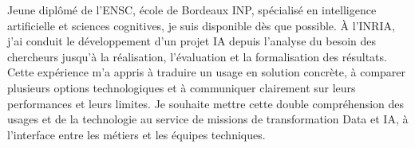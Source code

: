 
\begin{cvparagraph}
Jeune diplômé de l’ENSC, école de Bordeaux INP, spécialisé en intelligence artificielle et sciences cognitives, je suis disponible dès que possible. À l’INRIA, j’ai conduit le développement d’un projet IA depuis l’analyse du besoin des chercheurs jusqu’à la réalisation, l’évaluation et la formalisation des résultats. Cette expérience m’a appris à traduire un usage en solution concrète, à comparer plusieurs options technologiques et à communiquer clairement sur leurs performances et leurs limites. Je souhaite mettre cette double compréhension des usages et de la technologie au service de missions de transformation Data et IA, à l’interface entre les métiers et les équipes techniques.
\end{cvparagraph}
